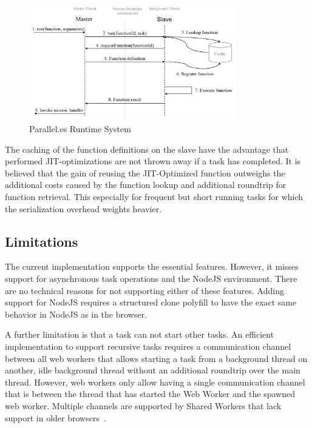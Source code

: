 \begin{figure}
	\centering
	\includegraphics[width=0.8\textwidth]{runtime-system.pdf}

	\caption{Parallel.es Runtime System}
	\label{fig:runtime-system}
\end{figure}

The caching of the function definitions on the slave have the advantage that performed JIT-optimizations are not thrown away if a task has completed. It is believed that the gain of reusing the JIT-Optimized function outweighs the additional costs caused by the function lookup and additional roundtrip for function retrieval. This especially for frequent but short running tasks for which the serialization overhead weights heavier. 


\subsection{Limitations}
The current implementation supports the essential features. However, it misses support for asynchronous task operations and the NodeJS environment. There are no technical reasons for not supporting either of these features. Adding support for NodeJS requires a structured clone polyfill to have the exact same behavior in NodeJS as in the browser.

A further limitation is that a task can not start other tasks. An efficient implementation to support recursive tasks requires a communication channel between all web workers that allows starting a task from a background thread on another, idle background thread without an additional roundtrip over the main thread. However, web workers only allow having a single communication channel that is between the thread that has started the Web Worker and the spawned web worker. Multiple channels are supported by Shared Workers that lack support in older browsers~\cite[section 4.6.4]{w3cWebWorker}.